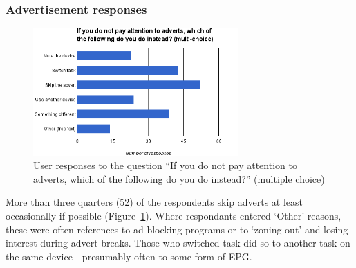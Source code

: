 \subsubsection{Advertisement responses}
\label{sec:prestudy_alternatives}
\begin{figure}[H]
	\centering
	\vspace{-10pt}
	\includegraphics[width=0.7\textwidth, clip=true, trim=0 0 0 55pt]{images/prestudy_alternatives.png}
	\caption{User responses to the question ``If you do not pay attention to adverts, which of the following do you do instead?'' (multiple choice)}
	\label{fig:prestudy_alternatives}
	\vspace{-25pt}
\end{figure}
More than three quarters (52) of the respondents skip adverts at least occasionally if possible (Figure~\ref{fig:prestudy_alternatives}). Where respondants entered `Other' reasons, these were often references to ad-blocking programs or to `zoning out' and losing interest during advert breaks. Those who switched task did so to another task on the same device - presumably often to some form of EPG.

